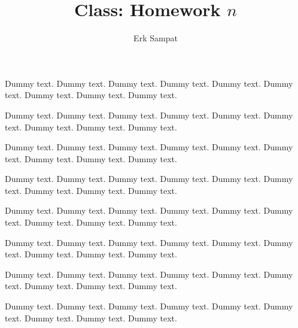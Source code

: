 \title{{\selectfont Class: } Homework $n$}
\author{Erk Sampat}



\maketitle
\prob
Dummy text. Dummy text. Dummy text. Dummy text. Dummy text. Dummy text. Dummy text. Dummy text. Dummy text.

Dummy text. Dummy text. Dummy text. Dummy text. Dummy text. Dummy text. Dummy text. Dummy text. Dummy text.
\begin{pp}
	Dummy text. Dummy text. Dummy text. Dummy text. Dummy text. Dummy text. Dummy text. Dummy text. Dummy text.
	
	Dummy text. Dummy text. Dummy text. Dummy text. Dummy text. Dummy text. Dummy text. Dummy text. Dummy text.
	\begin{spart}
		Dummy text. Dummy text. Dummy text. Dummy text. Dummy text. Dummy text. Dummy text. Dummy text. Dummy text.
		
		Dummy text. Dummy text. Dummy text. Dummy text. Dummy text. Dummy text. Dummy text. Dummy text. Dummy text.
	\end{spart}
	\begin{spart}
		Dummy text. Dummy text. Dummy text. Dummy text. Dummy text. Dummy text. Dummy text. Dummy text. Dummy text.
		
		Dummy text. Dummy text. Dummy text. Dummy text. Dummy text. Dummy text. Dummy text. Dummy text. Dummy text.
	\end{spart}
\end{pp}

